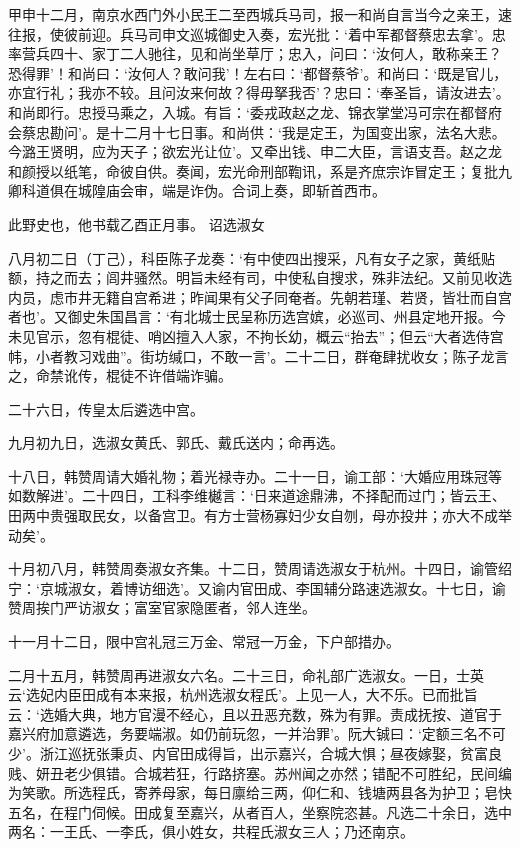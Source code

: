 \documentclass[]{article}
\begin{document}
甲申十二月，南京水西门外小民王二至西城兵马司，报一和尚自言当今之亲王，速往报，使彼前迎。兵马司申文巡城御史入奏，宏光批：`着中军都督蔡忠去拿'。忠率营兵四十、家丁二人驰往，见和尚坐草厅；忠入，问曰：`汝何人，敢称亲王？恐得罪'！和尚曰：`汝何人？敢问我'！左右曰：`都督蔡爷'。和尚曰：`既是官儿，亦宜行礼；我亦不较。且问汝来何故？得毋拏我否'？忠曰：`奉圣旨，请汝进去'。和尚即行。忠授马乘之，入城。有旨：`委戎政赵之龙、锦衣掌堂冯可宗在都督府会蔡忠勘问'。是十二月十七日事。和尚供：`我是定王，为国变出家，法名大悲。今潞王贤明，应为天子；欲宏光让位'。又牵出钱、申二大臣，言语支吾。赵之龙和颜授以纸笔，命彼自供。奏闻，宏光命刑部鞫讯，系是齐庶宗诈冒定王；复批九卿科道俱在城隍庙会审，端是诈伪。合词上奏，即斩首西市。

此野史也，他书载乙酉正月事。 诏选淑女

八月初二日（丁己），科臣陈子龙奏：`有中使四出搜采，凡有女子之家，黄纸贴额，持之而去；闾井骚然。明旨未经有司，中使私自搜求，殊非法纪。又前见收选内员，虑市井无籍自宫希进；昨闻果有父子同奄者。先朝若瑾、若贤，皆壮而自宫者也'。又御史朱国昌言：`有北城士民呈称历选宫嫔，必巡司、州县定地开报。今未见官示，忽有棍徒、哨凶擅入人家，不拘长幼，概云``抬去''；但云``大者选侍宫帏，小者教习戏曲''。街坊缄口，不敢一言'。二十二日，群奄肆扰收女；陈子龙言之，命禁讹传，棍徒不许借端诈骗。

二十六日，传皇太后遴选中宫。

九月初九日，选淑女黄氏、郭氏、戴氏送内；命再选。

十八日，韩赞周请大婚礼物；着光禄寺办。二十一日，谕工部：`大婚应用珠冠等如数解进'。二十四日，工科李维樾言：`日来道途鼎沸，不择配而过门；皆云王、田两中贵强取民女，以备宫卫。有方士营杨寡妇少女自刎，母亦投井；亦大不成举动矣'。

十月初八月，韩赞周奏淑女齐集。十二日，赞周请选淑女于杭州。十四日，谕管绍宁：`京城淑女，着博访细选'。又谕内官田成、李国辅分路速选淑女。十七日，谕赞周挨门严访淑女；富室官家隐匿者，邻人连坐。

十一月十二日，限中宫礼冠三万金、常冠一万金，下户部措办。

二月十五月，韩赞周再进淑女六名。二十三日，命礼部广选淑女。一日，士英云`选妃内臣田成有本来报，杭州选淑女程氏'。上见一人，大不乐。已而批旨云：`选婚大典，地方官漫不经心，且以丑恶充数，殊为有罪。责成抚按、道官于嘉兴府加意遴选，务要端淑。如仍前玩忽，一并治罪'。阮大铖曰：`定额三名不可少'。浙江巡抚张秉贞、内官田成得旨，出示嘉兴，合城大惧；昼夜嫁娶，贫富良贱、妍丑老少俱错。合城若狂，行路挤塞。苏州闻之亦然；错配不可胜纪，民间编为笑歌。所选程氏，寄养母家，每日廪给三两，仰仁和、钱塘两县各为护卫；皂快五名，在程门伺候。田成复至嘉兴，从者百人，坐察院恣甚。凡选二十余日，选中两名：一王氏、一李氏，俱小姓女，共程氏淑女三人；乃还南京。
\end{document}
